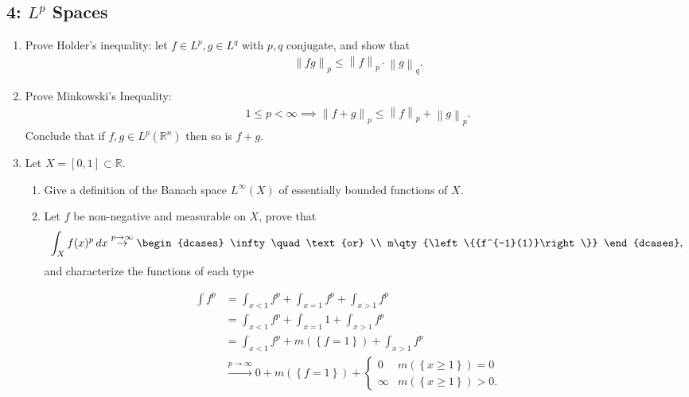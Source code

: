 \hypertarget{lp-spaces}{%
\subsection{\texorpdfstring{4: \(L^p\)
Spaces}{4: L\^{}p Spaces}}\label{lp-spaces}}

\begin{enumerate}
\def\labelenumi{\alph{enumi}.}
\item
  Prove Holder's inequality: let \(f\in L^p, g\in L^q\) with \(p, q\)
  conjugate, and show that
  \begin{align*}
  {\left\lVert {fg} \right\rVert}_{p} \leq {\left\lVert {f} \right\rVert}_{p} \cdot {\left\lVert {g} \right\rVert}_{q}
  .\end{align*}
\item
  Prove Minkowski's Inequality:
  \begin{align*}
  1\leq p < \infty \implies {\left\lVert {f+g} \right\rVert}_{p} \leq {\left\lVert {f} \right\rVert}_{p}+ {\left\lVert {g} \right\rVert}_{p}
  .\end{align*}
  Conclude that if \(f, g\in L^p({\mathbb{R}}^n)\) then so is \(f+g\).
\item
  Let \(X = [0, 1] \subset {\mathbb{R}}\).

  \begin{enumerate}
  \def\labelenumii{\arabic{enumii}.}
  \item
    Give a definition of the Banach space \(L^\infty(X)\) of essentially
    bounded functions of \(X\).
  \item
    Let \(f\) be non-negative and measurable on \(X\), prove that
    \begin{align*}
     \int_X f(x)^p \,dx \overset{p\to\infty}\to
     \begin{dcases}
     \infty \quad\text{or} \\
     m\qty{\left\{{f^{-1}(1)}\right\}}
     \end{dcases}
     ,\end{align*}
    and characterize the functions of each type
  \end{enumerate}
\end{enumerate}

\begin{solution}

\begin{align*}
\int f^p 
&= \int_{x < 1} f^p + \int_{x=1}f^p + \int_{x > 1} f^p\\
&= \int_{x < 1} f^p + \int_{x=1}1 + \int_{x > 1} f^p \\
&= \int_{x < 1} f^p + m(\left\{{f = 1}\right\}) + \int_{x > 1} f^p \\
&\overset{p\to\infty}\to 0  + m(\left\{{f = 1}\right\}) + 
\begin{cases} 
0 & m(\left\{{x\geq 1}\right\}) = 0 \\ 
\infty & m(\left\{{x\geq 1}\right\}) > 0.
\end{cases}
\end{align*}

\end{solution}

